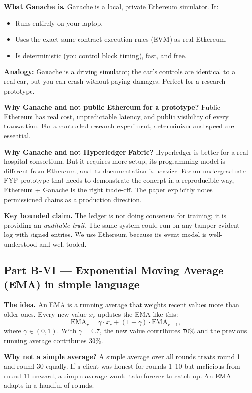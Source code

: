 \documentclass[11pt,a4paper]{article}
\begin{document}
\textbf{What Ganache is.}
Ganache is a local, private Ethereum simulator. It:
\begin{itemize}
\item Runs entirely on your laptop.
\item Uses the exact same contract execution rules (EVM) as real Ethereum.
\item Is deterministic (you control block timing), fast, and free.
\end{itemize}
\textbf{Analogy:} Ganache is a driving simulator; the car's controls are identical
to a real car, but you can crash without paying damages. Perfect for a research
prototype.

\textbf{Why Ganache and not public Ethereum for a prototype?}
Public Ethereum has real cost, unpredictable latency, and public visibility of
every transaction. For a controlled research experiment, determinism and
speed are essential.

\textbf{Why Ganache and not Hyperledger Fabric?}
Hyperledger is better for a real hospital consortium. But it requires more
setup, its programming model is different from Ethereum, and its documentation
is heavier. For an undergraduate FYP prototype that needs to demonstrate the
concept in a reproducible way, Ethereum + Ganache is the right trade-off. The
paper explicitly notes permissioned chains as a production direction.

\textbf{Key bounded claim.}
The ledger is not doing consensus for training; it is providing an
\emph{auditable trail}. The same system could run on any tamper-evident log
with signed entries. We use Ethereum because its event model is well-understood
and well-tooled.

\subsection{Part B-VI --- Exponential Moving Average (EMA) in simple language}
\label{sec:ema-conceptual}

\textbf{The idea.} An EMA is a running average that weights recent values more
than older ones. Every new value $x_r$ updates the EMA like this:
\[
\mathrm{EMA}_r = \gamma \cdot x_r + (1 - \gamma) \cdot \mathrm{EMA}_{r-1},
\]
where $\gamma \in (0, 1)$. With $\gamma = 0.7$, the new value contributes 70\%
and the previous running average contributes 30\%.

\textbf{Why not a simple average?}
A simple average over all rounds treats round 1 and round 30 equally. If a client
was honest for rounds 1--10 but malicious from round 11 onward, a simple average
would take forever to catch up. An EMA adapts in a handful of rounds.
\end{document}

